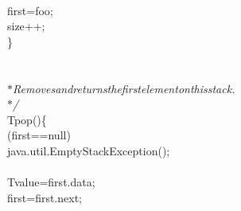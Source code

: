 {{\begin{tabbing}
\\
\hspace{48pt}first\hspace{6pt}=\hspace{6pt}foo;\\
\hspace{48pt}size++;\\
\hspace{24pt}\}\\
\\
\hspace{24pt}{\it{/$\ast$$\ast$}}\\
{\it{\hspace{30pt}$\ast$\hspace{6pt}Removes\hspace{6pt}and\hspace{6pt}returns\hspace{6pt}the\hspace{6pt}first\hspace{6pt}element\hspace{6pt}on\hspace{6pt}this\hspace{6pt}stack.}}\\
{\it{\hspace{30pt}$\ast$/}}\\
\hspace{6pt}T\hspace{6pt}pop()\hspace{6pt}\{\\
(first\hspace{6pt}==\hspace{6pt}null)\\
\hspace{6pt}java.util.EmptyStackException();\\
\\
\hspace{48pt}T\hspace{6pt}value\hspace{6pt}=\hspace{6pt}first.data;\\
\hspace{48pt}first\hspace{6pt}=\hspace{6pt}first.next;\\

\end{tabbing}}}
